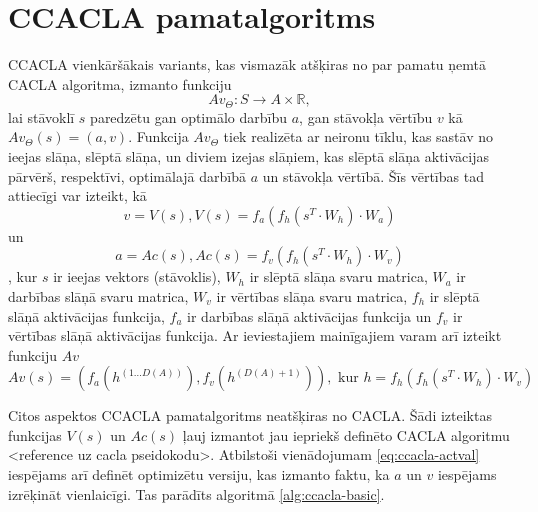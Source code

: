 \documentclass{ludis} %
\begin{document}
\section{CCACLA pamatalgoritms}
CCACLA vienkāršākais variants, kas vismazāk atšķiras no par pamatu ņemtā CACLA
algoritma, izmanto funkciju 
\begin{equation}
  Av_\Theta:S \rightarrow A \times \mathbb{R},
\end{equation}
lai stāvoklī $s$ paredzētu gan optimālo darbību $a$, gan stāvokļa vērtību $v$ kā
$Av_\Theta(s) = (a, v)$. Funkcija $Av_\Theta$ tiek realizēta ar
neironu tīklu, kas sastāv no ieejas slāņa, slēptā slāņa, un diviem izejas
slāņiem, kas slēptā slāņa aktivācijas pārvērš, respektīvi, optimālajā darbībā
$a$ un stāvokļa vērtībā. Šīs vērtības tad attiecīgi var izteikt, kā
\begin{equation}\label{eq:ccacla-act}
  v = V(s), V(s) = f_a\left(f_h(s^T \cdot W_h) \cdot W_a\right)
\end{equation} un
\begin{equation}\label{eq:ccacla-val}
  a = Ac(s), Ac(s) = f_v\left(f_h(s^T \cdot W_h) \cdot W_v\right)
\end{equation}, kur $s$ ir
ieejas vektors (stāvoklis), $W_h$ ir slēptā slāņa svaru matrica, $W_a$ ir
darbības slāņā svaru matrica, $W_v$ ir vērtības slāņa svaru matrica, $f_h$ ir
slēptā slāņā aktivācijas funkcija, $f_a$ ir darbības slāņā aktivācijas funkcija
un $f_v$ ir vērtības slāņā aktivācijas funkcija. Ar ieviestajiem mainīgajiem
varam arī izteikt funkciju $Av$
\begin{equation}\label{eq:ccacla-actval}
  Av(s) = \left(f_a(h^{(1 \ldots D(A))}), f_v(h^{(D(A) + 1)})\right), \text{ kur } 
  h = f_h\left(f_h(s^T \cdot W_h) \cdot W_v\right)
\end{equation}

Citos aspektos CCACLA pamatalgoritms neatšķiras no CACLA. Šādi izteiktas funkcijas
$V(s)$ un $Ac(s)$ ļauj izmantot jau iepriekš definēto CACLA algoritmu <reference
uz cacla pseidokodu>. Atbilstoši vienādojumam \ref{eq:ccacla-actval} iespējams
arī definēt optimizētu versiju, kas izmanto faktu, ka $a$ un $v$ iespējams
izrēķināt vienlaicīgi. Tas parādīts algoritmā \ref{alg:ccacla-basic}.
\end{document}
